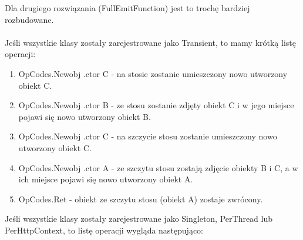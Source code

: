 \documentclass[12pt]{article}
\begin{document}
Dla drugiego rozwiązania (FullEmitFunction) jest to trochę bardziej rozbudowane.\\
\\
Jeśli wszystkie klasy zostały zarejestrowane jako Transient, to mamy krótką listę operacji:
\begin{enumerate}
	\item OpCodes.Newobj .ctor C - na stosie zostanie umieszczony nowo utworzony obiekt C.
	\item OpCodes.Newobj .ctor B - ze stosu zostanie zdjęty obiekt C i w jego miejsce pojawi się nowo utworzony obiekt B.
	\item OpCodes.Newobj .ctor C - na szczycie stosu zostanie umieszczony nowo utworzony obiekt C.
	\item OpCodes.Newobj .ctor A - ze szczytu stosu zostają zdjęcie obiekty B i C, a w ich miejsce pojawi się nowo utworzony obiekt A.
	\item OpCodes.Ret - obiekt ze szczytu stosu (obiekt A) zostaje zwrócony.
\end{enumerate}
Jeśli wszystkie klasy zostały zarejestrowane jako Singleton, PerThread lub PerHttpContext, to listę operacji wygląda następująco:
\end{document}
